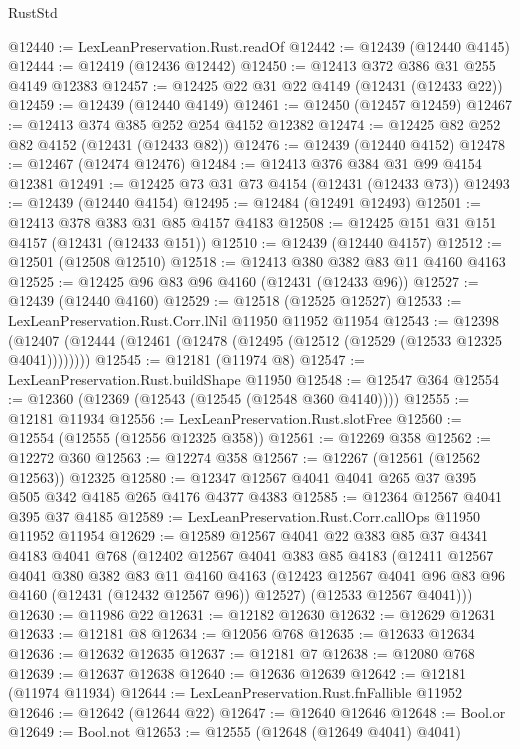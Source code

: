 \begin{lexlean}{RustStd}
\begin{coremodule}
@12440 := LexLeanPreservation.Rust.readOf
@12442 := @12439 (@12440 @4145)
@12444 := @12419 (@12436 @12442)
@12450 := @12413 @372 @386 @31 @255 @4149 @12383
@12457 := @12425 @22 @31 @22 @4149 (@12431 (@12433 @22))
@12459 := @12439 (@12440 @4149)
@12461 := @12450 (@12457 @12459)
@12467 := @12413 @374 @385 @252 @254 @4152 @12382
@12474 := @12425 @82 @252 @82 @4152 (@12431 (@12433 @82))
@12476 := @12439 (@12440 @4152)
@12478 := @12467 (@12474 @12476)
@12484 := @12413 @376 @384 @31 @99 @4154 @12381
@12491 := @12425 @73 @31 @73 @4154 (@12431 (@12433 @73))
@12493 := @12439 (@12440 @4154)
@12495 := @12484 (@12491 @12493)
@12501 := @12413 @378 @383 @31 @85 @4157 @4183
@12508 := @12425 @151 @31 @151 @4157 (@12431 (@12433 @151))
@12510 := @12439 (@12440 @4157)
@12512 := @12501 (@12508 @12510)
@12518 := @12413 @380 @382 @83 @11 @4160 @4163
@12525 := @12425 @96 @83 @96 @4160 (@12431 (@12433 @96))
@12527 := @12439 (@12440 @4160)
@12529 := @12518 (@12525 @12527)
@12533 := LexLeanPreservation.Rust.Corr.lNil @11950 @11952 @11954
@12543 := @12398
    (@12407 (@12444 (@12461 (@12478 (@12495 (@12512 (@12529 (@12533 @12325 @4041))))))))
@12545 := @12181 (@11974 @8)
@12547 := LexLeanPreservation.Rust.buildShape @11950
@12548 := @12547 @364
@12554 := @12360 (@12369 (@12543 (@12545 (@12548 @360 @4140))))
@12555 := @12181 @11934
@12556 := LexLeanPreservation.Rust.slotFree
@12560 := @12554 (@12555 (@12556 @12325 @358))
@12561 := @12269 @358
@12562 := @12272 @360
@12563 := @12274 @358
@12567 := @12267 (@12561 (@12562 @12563)) @12325
@12580 := @12347 @12567 @4041 @4041 @265 @37 @395 @505 @342 @4185 @265 @4176 @4377 @4383
@12585 := @12364 @12567 @4041 @395 @37 @4185
@12589 := LexLeanPreservation.Rust.Corr.callOps @11950 @11952 @11954
@12629 := @12589
    @12567
    @4041
    @22
    @383
    @85
    @37
    @4341
    @4183
    @4041
    @768
    (@12402
      @12567
      @4041
      @383
      @85
      @4183
      (@12411
        @12567
        @4041
        @380
        @382
        @83
        @11
        @4160
        @4163
        (@12423 @12567 @4041 @96 @83 @96 @4160 (@12431 (@12432 @12567 @96)) @12527)
        (@12533 @12567 @4041)))
@12630 := @11986 @22
@12631 := @12182 @12630
@12632 := @12629 @12631
@12633 := @12181 @8
@12634 := @12056 @768
@12635 := @12633 @12634
@12636 := @12632 @12635
@12637 := @12181 @7
@12638 := @12080 @768
@12639 := @12637 @12638
@12640 := @12636 @12639
@12642 := @12181 (@11974 @11934)
@12644 := LexLeanPreservation.Rust.fnFallible @11952
@12646 := @12642 (@12644 @22)
@12647 := @12640 @12646
@12648 := Bool.or
@12649 := Bool.not
@12653 := @12555 (@12648 (@12649 @4041) @4041)

\end{coremodule}
\end{lexlean}
